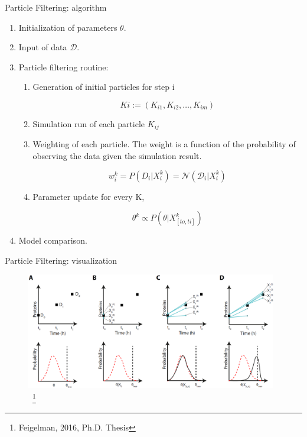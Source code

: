 \documentclass[pdf]
{beamer}
\begin{document}
\begin{frame}{Particle Filtering: algorithm}
	\begin{enumerate}
		\item Initialization of parameters $\theta$.
		\item Input of data $\mathcal{D}$.
		\item Particle filtering routine:

		\begin{enumerate}
			\item Generation of initial particles for step i
			
			\begin{equation}
				Ki := (K_{i1}, K_{i2}, \dots, K_{im})
			\end{equation}

			\item Simulation run of each particle $K_{ij}$
			\item Weighting of each particle. The weight is a function of the probability of observing the data given the simulation result.

			\begin{equation}
				w_i^k = P(D_i | X_i^k) = \mathcal{N}(\mathcal{D}_i | X_i^k)
			\end{equation}

			\item Parameter update for every K,

			\begin{equation}
				\theta^k \propto P(\theta | X^k_{[to, ti]})\label{eq:13}
			\end{equation}

		\end{enumerate}

		\item Model comparison.

	\end{enumerate}
\end{frame}

\begin{frame}{Particle Filtering: visualization}
	\begin{figure}[ht]
		\begin{center}
			\includegraphics[height=2in]{figures/particle_filtering.png}
			~\footnote{Feigelman, 2016, Ph.D. Thesis}
		\end{center}
	\end{figure}
\end{frame}
\end{document}
